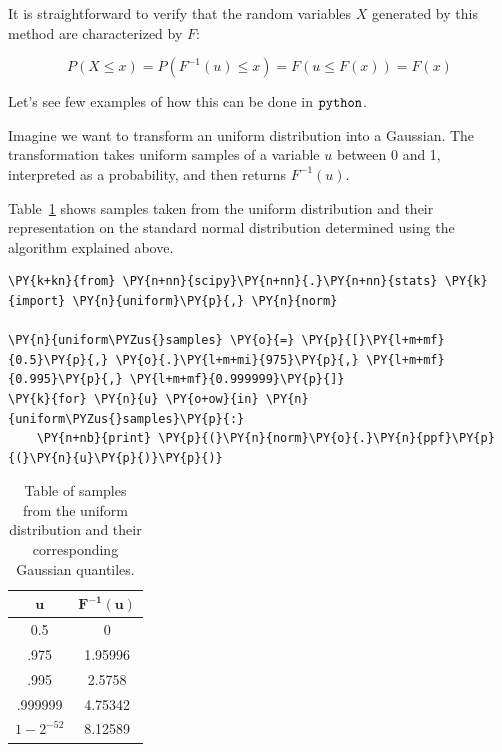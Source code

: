 It is straightforward to verify that the random variables \(X\)
generated by this method are characterized by \(F\):

\begin{equation}
	P(X \leq x) = P(F^{−1}(u) \leq x) = F(u \leq F(x)) = F(x)
\end{equation}

Let's see few examples of how this can be done in \(\tt{python}\).

Imagine we want to transform an uniform distribution into a Gaussian.
The transformation takes uniform samples of a variable \(u\) between 0 and
1, interpreted as a probability, and then returns $F^{-1}(u)$. 

Table~\ref{tab:transformation} shows samples taken from the
uniform distribution and their representation on the standard normal
distribution determined using the algorithm explained above.

\begin{tcolorbox}[breakable, size=fbox, boxrule=1pt, pad at break*=1mm,colback=cellbackground, colframe=cellborder]
\begin{Verbatim}[commandchars=\\\{\}]
\PY{k+kn}{from} \PY{n+nn}{scipy}\PY{n+nn}{.}\PY{n+nn}{stats} \PY{k}{import} \PY{n}{uniform}\PY{p}{,} \PY{n}{norm}
		
\PY{n}{uniform\PYZus{}samples} \PY{o}{=} \PY{p}{[}\PY{l+m+mf}{0.5}\PY{p}{,} \PY{o}{.}\PY{l+m+mi}{975}\PY{p}{,} \PY{l+m+mf}{0.995}\PY{p}{,} \PY{l+m+mf}{0.999999}\PY{p}{]}
\PY{k}{for} \PY{n}{u} \PY{o+ow}{in} \PY{n}{uniform\PYZus{}samples}\PY{p}{:}
    \PY{n+nb}{print} \PY{p}{(}\PY{n}{norm}\PY{o}{.}\PY{n}{ppf}\PY{p}{(}\PY{n}{u}\PY{p}{)}\PY{p}{)}
\end{Verbatim}
\end{tcolorbox}

\begin{table}[h]
  \centering
  \begin{tabular}{|c|c|}
    \hline
    \(\mathbf{u}\) & \(\mathbf{F^{-1}(u)}\) \\
    \hline
    0.5 & 0 \\
    \hline
    .975 & 1.95996 \\
    \hline
    .995 & 2.5758 \\
    \hline
    .999999 & 4.75342 \\
    \hline
    \(1-2^{-52}\) & 8.12589 \\
    \hline
  \end{tabular}
  \caption{Table of samples from the uniform distribution and their corresponding Gaussian quantiles.}
\label{tab:transformation}
\end{table}

